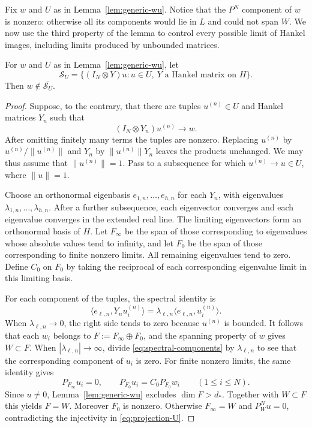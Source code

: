 Fix $w$ and $U$ as in Lemma~\ref{lem:generic-wu}.  Notice that the
$P^N$ component of $w$ is nonzero: otherwise all its components would
lie in $L$ and could not span $W$.  We now use the third property of
the lemma to control every possible limit of Hankel images, including
limits produced by unbounded matrices.

\begin{lemma}
\label{lem:separation}
For $w$ and $U$ as in Lemma~\ref{lem:generic-wu}, let
\[
 \mathcal S_U=
 \{(I_N\otimes Y)u: u\in U,\ Y\text{ a Hankel matrix on }H\}.
\]
Then $w\notin\overline{\mathcal S_U}$.
\end{lemma}

\begin{proof}
Suppose, to the contrary, that there are tuples $u^{(n)}\in U$ and
Hankel matrices $Y_n$ such that
\[
 (I_N\otimes Y_n)u^{(n)}\longrightarrow w.
\]
After omitting finitely many terms the tuples are nonzero.  Replacing
$u^{(n)}$ by $u^{(n)}/\|u^{(n)}\|$ and $Y_n$ by
$\|u^{(n)}\|Y_n$ leaves the products unchanged.  We may thus assume
that $\|u^{(n)}\|=1$.  Pass to a subsequence for which
$u^{(n)}\to u\in U$, where $\|u\|=1$.

Choose an orthonormal eigenbasis $e_{1,n},\ldots,e_{h,n}$ for each
$Y_n$, with eigenvalues $\lambda_{1,n},\ldots,\lambda_{h,n}$.
After a further subsequence, each eigenvector converges and each
eigenvalue converges in the extended real line.  The limiting
eigenvectors form an orthonormal basis of $H$.  Let $F_\infty$ be
the span of those corresponding to eigenvalues whose absolute
values tend to infinity, and let $F_0$ be the span of those
corresponding to finite nonzero limits.  All remaining eigenvalues
tend to zero.  Define $C_0$ on $F_0$ by taking the reciprocal of
each corresponding eigenvalue limit in this limiting basis.

For each component of the tuples, the spectral identity is
\begin{equation}
\label{eq:spectral-components}
 \langle e_{\ell,n},Y_nu_i^{(n)}\rangle
 =\lambda_{\ell,n}\langle e_{\ell,n},u_i^{(n)}\rangle.
\end{equation}
When $\lambda_{\ell,n}\to0$, the right side tends to zero because
$u^{(n)}$ is bounded.  It follows that each $w_i$ belongs to
$F:=F_\infty\oplus F_0$, and the spanning property of $w$ gives
$W\subset F$.  When $|\lambda_{\ell,n}|\to\infty$, divide
\eqref{eq:spectral-components} by $\lambda_{\ell,n}$ to see that
the corresponding component of $u_i$ is zero.  For finite nonzero
limits, the same identity gives
\[
 P_{F_\infty}u_i=0,\qquad
 P_{F_0}u_i=C_0P_{F_0}w_i
 \qquad(1\le i\le N).
\]
Since $u\ne0$, Lemma~\ref{lem:generic-wu} excludes $\dim F>d_*$.
Together with $W\subset F$ this yields $F=W$.  Moreover $F_0$ is
nonzero.  Otherwise $F_\infty=W$ and $P_W^Nu=0$, contradicting
the injectivity in \eqref{eq:projection-U}.


\end{proof}
